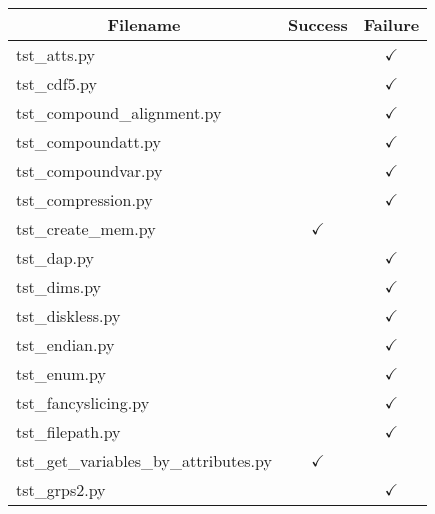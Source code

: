 \begin{table}[H]
\centering
\begin{tabular}{|l|c|c|}
\hline
\multicolumn{1}{|c|}{Filename}          & \multicolumn{1}{c|}{Success} & \multicolumn{1}{c|}{Failure} \\ \hline \hline
tst\_atts.py                            &                              &      $\checkmark$         \\ \hline
tst\_cdf5.py                            &                              &      $\checkmark$         \\ \hline
tst\_compound\_alignment.py             &                              &      $\checkmark$         \\ \hline
tst\_compoundatt.py                     &                              &      $\checkmark$         \\ \hline
tst\_compoundvar.py                     &                              &      $\checkmark$         \\ \hline
tst\_compression.py                     &                              &      $\checkmark$         \\ \hline
tst\_create\_mem.py                     &          $\checkmark$        &                           \\ \hline
tst\_dap.py                             &                              &      $\checkmark$         \\ \hline
tst\_dims.py                            &                              &      $\checkmark$         \\ \hline
tst\_diskless.py                        &                              &      $\checkmark$         \\ \hline
tst\_endian.py                          &                              &      $\checkmark$         \\ \hline
tst\_enum.py                            &                              &      $\checkmark$         \\ \hline
tst\_fancyslicing.py                    &                              &      $\checkmark$         \\ \hline
tst\_filepath.py                        &                              &      $\checkmark$         \\ \hline
tst\_get\_variables\_by\_attributes.py  &          $\checkmark$        &                           \\ \hline
tst\_grps2.py                           &                              &      $\checkmark$         \\ \hline

\end{tabular}
\end{table}
